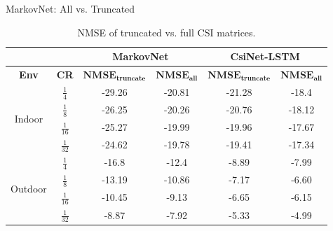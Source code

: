 \documentclass{beamer}
\begin{document}
  \begin{frame}{MarkovNet: All vs. Truncated}
    \footnotesize{
    \begin{table}[htb]
      \renewcommand{\arraystretch}{1.5}
      \begin{center}
        \begin{tabular}{|c|c|c|c|c|c|}
        \hline
                                            &                  & \multicolumn{2}{c|}{\textbf{MarkovNet}} & \multicolumn{2}{c|}{\textbf{CsiNet-LSTM}} \\ \hline
        \textbf{Env}                        & \textbf{CR}      & $\mathbf{\text{NMSE}_{\text{truncate}}}$ & $\mathbf{\text{NMSE}_{\text{all}}}$ & $\mathbf{\text{NMSE}_{\text{truncate}}}$ & $\mathbf{\text{NMSE}_{\text{all}}}$ \\ \hline
        \multirow{4}{*}{Indoor}   & $\frac 14$       & -29.26       & -20.81                 & -21.28      &  -18.4 \\ \cline{2-6}
                                  & $\frac 18$       & -26.25       & -20.26                 & -20.76      &  -18.12 \\ \cline{2-6}
                                  & $\frac {1}{16}$  & -25.27       & -19.99                 & -19.96      &  -17.67 \\ \cline{2-6}
                                  & $\frac {1}{32}$  & -24.62       & -19.78                 & -19.41      &  -17.34 \\ \hline
        \multirow{4}{*}{Outdoor}  & $\frac 14$       & -16.8        & -12.4                  & -8.89       & -7.99                   \\ \cline{2-6}
                                  & $\frac 18$       & -13.19       & -10.86                 & -7.17       & -6.60                   \\ \cline{2-6}
                                  & $\frac {1}{16}$  & -10.45       & -9.13                  & -6.65       & -6.15                   \\ \cline{2-6}
                                  & $\frac {1}{32}$  & -8.87        & -7.92                  & -5.33       & -4.99                   \\ \hline
        \end{tabular}
        \caption{NMSE of truncated vs. full CSI matrices.}
        \label{tab:nmse-truncate-compare} 
      \end{center}
    \end{table}
    }
  \end{frame}
\end{document}
